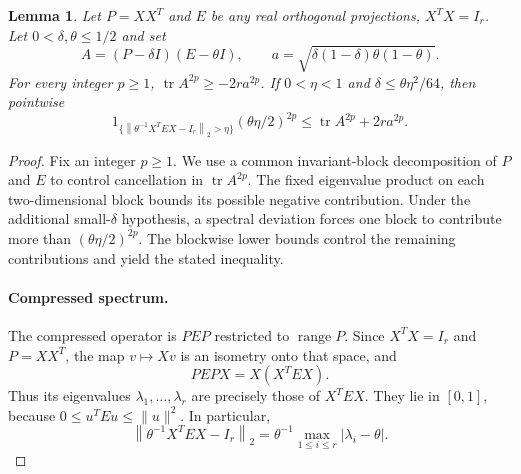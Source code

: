 \documentclass[11pt]{article}
\newtheorem{lemma}[theorem]{Lemma}
\theoremstyle{definition}
\theoremstyle{remark}
\theoremstyle{plain}
\DeclareMathOperator{\tr}{tr}
\newcommand{\norm}[1]{\left\lVert#1\right\rVert_2}
\begin{document}
\begin{lemma}\label{lem:transfer}
Let \(P=XX^T\) and \(E\) be any real orthogonal projections,
\(X^TX=I_r\). Let \(0<\delta,\theta\le1/2\) and set
\[
 A=(P-\delta I)(E-\theta I),\qquad
 a=\sqrt{\delta(1-\delta)\theta(1-\theta)}.
\]
For every integer \(p\ge1\), \(\tr A^{2p}\ge-2r a^{2p}\).
If \(0<\eta<1\) and \(\delta\le\theta\eta^2/64\), then pointwise
\begin{equation}\label{eq:spectral-transfer}
 1_{\{\norm{\theta^{-1}X^TEX-I_r}>\eta\}}
          (\theta\eta/2)^{2p}
                \le\tr A^{2p}+2r a^{2p}.
\end{equation}
\end{lemma}
\begin{proof}
Fix an integer \(p\ge1\). We use a common invariant-block
decomposition of \(P\) and \(E\) to control cancellation in
\(\tr A^{2p}\). The fixed eigenvalue product on each
two-dimensional block bounds its possible negative contribution.
Under the additional small-\(\delta\) hypothesis, a spectral
deviation forces one block to contribute more than
\((\theta\eta/2)^{2p}\). The blockwise lower bounds control the
remaining contributions and yield the stated inequality.

\paragraph{Compressed spectrum.}
The compressed operator is \(PEP\) restricted to
\(\operatorname{range}P\). Since \(X^TX=I_r\) and \(P=XX^T\),
the map \(v\mapsto Xv\) is an isometry onto that space, and
\[
 PEPX=X(X^TEX).
\]
Thus its eigenvalues \(\lambda_1,\ldots,\lambda_r\) are precisely
those of \(X^TEX\). They lie in \([0,1]\), because
\(0\le u^TEu\le\|u\|^2\). In particular,
\[
 \norm{\theta^{-1}X^TEX-I_r}
       =\theta^{-1}\max_{1\le i\le r}|\lambda_i-\theta|.
\]


\end{proof}
\end{document}
